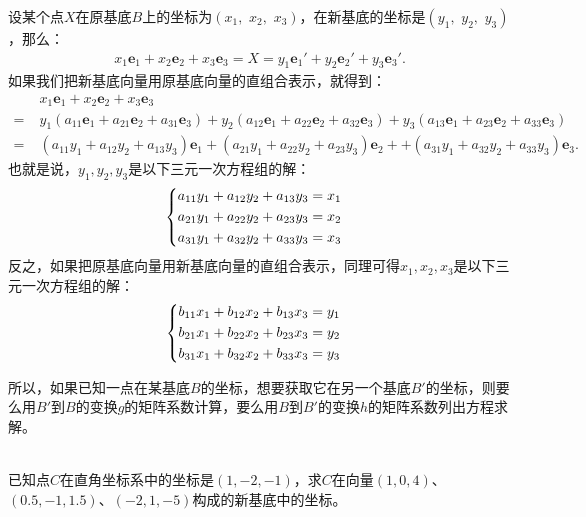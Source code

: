 \documentclass[12pt,UTF8,fontset=none]{ctexbook}
\begin{document}
设某个点$X$在原基底$B$上的坐标为$(x_1,\,\, x_2, \,\,x_3)$，在新基底的坐标是$(y_1,\,\,y_2,\,\,y_3)$，那么：
\begin{align*}
    x_1\mathbf{e}_1 + x_2\mathbf{e}_2 + x_3\mathbf{e}_3 = X = y_1\mathbf{e}_1' + y_2\mathbf{e}_2' + y_3\mathbf{e}_3'.
\end{align*}
如果我们把新基底向量用原基底向量的直组合表示，就得到：
\begin{align*}
    &x_1\mathbf{e}_1 + x_2\mathbf{e}_2 + x_3\mathbf{e}_3 \\ 
    =\;& y_1(a_{11}\mathbf{e}_1 + a_{21}\mathbf{e}_2 + a_{31}\mathbf{e}_3) + y_2(a_{12}\mathbf{e}_1 + a_{22}\mathbf{e}_2 + a_{32}\mathbf{e}_3) + y_3(a_{13}\mathbf{e}_1 + a_{23}\mathbf{e}_2 + a_{33}\mathbf{e}_3)  \\ 
    =\;& (a_{11}y_1 + a_{12}y_2 + a_{13}y_3)\mathbf{e}_1 + (a_{21}y_1 + a_{22}y_2 + a_{23}y_3)\mathbf{e}_2 +  + (a_{31}y_1 + a_{32}y_2 + a_{33}y_3)\mathbf{e}_3. 
\end{align*}
也就是说，$y_1,y_2,y_3$是以下三元一次方程组的解：
\begin{alignat*}{1}
    &   \begin{dcases}
            a_{11}y_1 + a_{12}y_2 + a_{13}y_3 = x_1 \\
            a_{21}y_1 + a_{22}y_2 + a_{23}y_3 = x_2 \\
            a_{31}y_1 + a_{32}y_2 + a_{33}y_3 = x_3
        \end{dcases}
\end{alignat*}
反之，如果把原基底向量用新基底向量的直组合表示，同理可得$x_1,x_2,x_3$是以下三元一次方程组的解：
\begin{alignat*}{1}
    &   \begin{dcases}
            b_{11}x_1 + b_{12}x_2 + b_{13}x_3 = y_1 \\
            b_{21}x_1 + b_{22}x_2 + b_{23}x_3 = y_2 \\
            b_{31}x_1 + b_{32}x_2 + b_{33}x_3 = y_3
        \end{dcases}
\end{alignat*}

所以，如果已知一点在某基底$B$的坐标，想要获取它在另一个基底$B'$的坐标，则要么用$B'$到$B$的变换$g$的矩阵系数计算，要么用$B$到$B'$的变换$h$的矩阵系数列出方程求解。

\begin{et}
    \mbox{} \\
    已知点$C$在直角坐标系中的坐标是$(1,-2,-1)$，求$C$在向量$(1,0,4)$、$(0.5,-1,1.5)$、$(-2,1,-5)$构成的新基底中的坐标。
\end{et}
\end{document}
